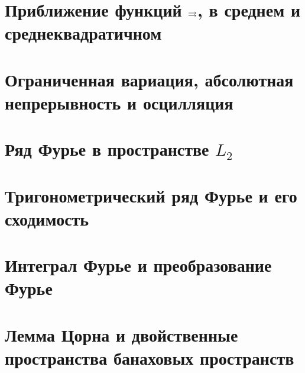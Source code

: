 

\section{Приближение функций \texorpdfstring{$\rightrightarrows$}{равномерно}, в среднем и среднеквадратичном}

 
 
 
 
 


\section{Ограниченная вариация, абсолютная непрерывность и осцилляция}










\section{Ряд Фурье в пространстве \texorpdfstring{$L_2$}{L2}}
 
 
 
 


\section{Тригонометрический ряд Фурье и его сходимость}
 
 
 
 
 
 
 



\section{Интеграл Фурье и преобразование Фурье}









% 
% 
% 
% 


\section{Лемма Цорна и двойственные пространства банаховых пространств}








%  
%  
